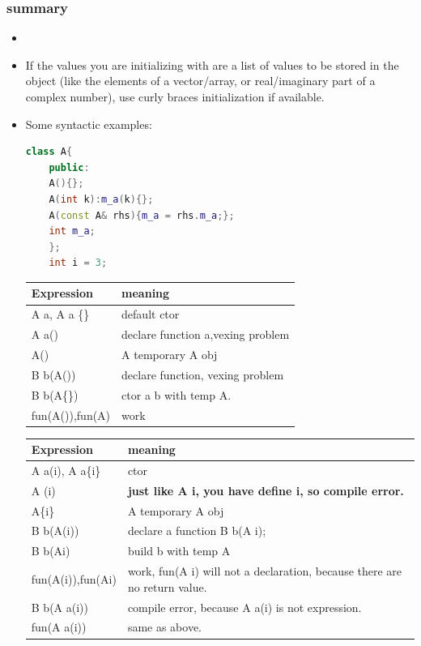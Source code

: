 \documentclass[a4paper,12pt,twoside]{book}
\begin{document}
\subsubsection{summary}
\begin{itemize}
	\item \item If the values you are initializing with are a list of values to be stored in the object (like the elements of a vector/array, or real/imaginary part of a complex number), use curly braces initialization if available.
	
	\item Some syntactic examples:
	\begin{lstlisting}[frame=single, language=c++]
	class A{
	public:
	A(){};
	A(int k):m_a(k){};
	A(const A& rhs){m_a = rhs.m_a;};
	int m_a;
	};
	int i = 3;
	\end{lstlisting}
	\begin{tabular}{|p{}|p{}|}
		\hline
		Expression & meaning \\
		\hline
		A a, A a \{\} & default ctor \\
		\hline
		A a() & declare function a,vexing problem \\
		\hline
		A() & A temporary A obj\\
		\hline
		B b(A()) & declare function, vexing problem \\
		\hline
		B b(A\{\}) & ctor a b with temp A. \\
		\hline
		fun(A()),fun(A{}) & work\\
		\hline
	\end{tabular}
	
	\begin{tabular}{|p{}|p{}|}
		\hline
		Expression & meaning \\
		\hline
		A a(i), A a\{i\} & ctor\\
		\hline
		A (i) & \textbf{just like A i, you have define i, so compile error.} \\
		\hline
		A\{i\} & A temporary A obj\\
		\hline
		B b(A(i)) & declare a function B b(A i); \\
		\hline
		B b(A{i}) & build b with temp A\\
		\hline
		fun(A(i)),fun(A{i}) & work, fun(A i) will not a declaration, because there are no return value.\\
		\hline
		B b(A a(i))  & compile error, because A a(i) is not expression. \\
		\hline
		fun(A a(i)) & same as above. \\
		\hline
	\end{tabular}
	

\end{itemize}
\end{document}
